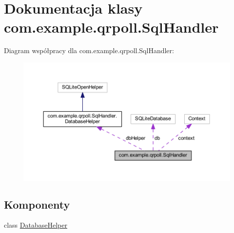\hypertarget{classcom_1_1example_1_1qrpoll_1_1_sql_handler}{\section{Dokumentacja klasy com.\+example.\+qrpoll.\+Sql\+Handler}
\label{classcom_1_1example_1_1qrpoll_1_1_sql_handler}
}


Diagram współpracy dla com.\+example.\+qrpoll.\+Sql\+Handler\+:\nopagebreak
\begin{figure}[H]
\begin{center}
\leavevmode
\includegraphics[width=350pt]{classcom_1_1example_1_1qrpoll_1_1_sql_handler__coll__graph}
\end{center}
\end{figure}
\subsection*{Komponenty}
\begin{DoxyCompactItemize}
\item 
class \hyperlink{classcom_1_1example_1_1qrpoll_1_1_sql_handler_1_1_database_helper}{Database\+Helper}
\end{DoxyCompactItemize}
